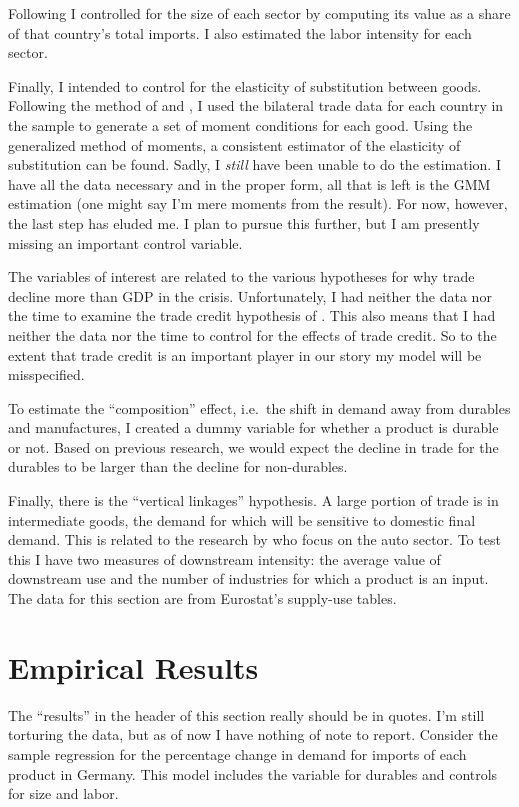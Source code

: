 \documentclass[11pt]{article}
\begin{document}
  Following \cite{llt:2010} I controlled for the size of each sector by computing its value as a share of that country's total imports. I also estimated the labor intensity for each sector.

  Finally, I intended to control for the elasticity of substitution between goods.  Following the method of \cite{weinstein-broda:2004} and \cite{feenstra:1994}, I used the bilateral trade data for each country in the sample to generate a set of moment conditions for each good.  Using the generalized method of moments, a consistent estimator of the elasticity of substitution can be found. Sadly, I \emph{still} have been unable to do the estimation.  I have all the data necessary and in the proper form, all that is left is the GMM estimation (one might say I'm mere moments from the result).  For now, however, the last step has eluded me. I plan to pursue this further, but I am presently missing an important control variable.

  The variables of interest are related to the various hypotheses for why trade decline more than GDP in the crisis.  Unfortunately, I had neither the data nor the time to examine the trade credit hypothesis of \cite{chor-manova:2012}.  This also means that I had neither the data nor the time to control for the effects of trade credit.  So to the extent that trade credit is an important player in our story my model will be misspecified.

  To estimate the ``composition'' effect, i.e.\ the shift in demand away from durables and manufactures, I created a dummy variable for whether a product is durable or not.  Based on previous research, we would expect the decline in trade for the durables to be larger than the decline for non-durables.
  
  Finally, there is the ``vertical linkages'' hypothesis. A large portion of trade is in intermediate goods, the demand for which will be sensitive to domestic final demand. This is related to the research by \cite{alessandria-kaboski:2010} who focus on the auto sector.  To test this I have two measures of downstream intensity: the average value of downstream use and the number of industries for which a product is an input.  The data for this section are from Eurostat's supply-use tables.

\section{Empirical Results} %
\label{sec:empirical_results}
  The ``results'' in the header of this section really should be in quotes.  I'm still torturing the data, but as of now I have nothing of note to report.  Consider the sample regression for the percentage change in demand for imports of each product in Germany.  This model includes the variable for durables and controls for size and labor.
\end{document}
